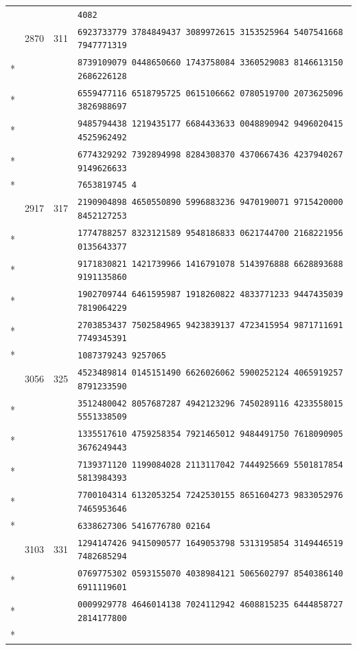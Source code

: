 \documentclass[10pt]{article}
\begin{document}
\begin{longtable}{@{}r@{\quad}r@{\quad}r@{\quad}l@{}}
 & &  & \texttt{4082}\\
\addlinespace[2pt]
69 & 2870 & 311 & \texttt{6923733779 3784849437 3089972615 3153525964 5407541668 7947771319}\\*
 & &  & \texttt{8739109079 0448650660 1743758084 3360529083 8146613150 2686226128}\\*
 & &  & \texttt{6559477116 6518795725 0615106662 0780519700 2073625096 3826988697}\\*
 & &  & \texttt{9485794438 1219435177 6684433633 0048890942 9496020415 4525962492}\\*
 & &  & \texttt{6774329292 7392894998 8284308370 4370667436 4237940267 9149626633}\\*
 & &  & \texttt{7653819745 4}\\
\addlinespace[2pt]
70 & 2917 & 317 & \texttt{2190904898 4650550890 5996883236 9470190071 9715420000 8452127253}\\*
 & &  & \texttt{1774788257 8323121589 9548186833 0621744700 2168221956 0135643377}\\*
 & &  & \texttt{9171830821 1421739966 1416791078 5143976888 6628893688 9191135860}\\*
 & &  & \texttt{1902709744 6461595987 1918260822 4833771233 9447435039 7819064229}\\*
 & &  & \texttt{2703853437 7502584965 9423839137 4723415954 9871711691 7749345391}\\*
 & &  & \texttt{1087379243 9257065}\\
\addlinespace[2pt]
71 & 3056 & 325 & \texttt{4523489814 0145151490 6626026062 5900252124 4065919257 8791233590}\\*
 & &  & \texttt{3512480042 8057687287 4942123296 7450289116 4233558015 5551338509}\\*
 & &  & \texttt{1335517610 4759258354 7921465012 9484491750 7618090905 3676249443}\\*
 & &  & \texttt{7139371120 1199084028 2113117042 7444925669 5501817854 5813984393}\\*
 & &  & \texttt{7700104314 6132053254 7242530155 8651604273 9833052976 7465953646}\\*
 & &  & \texttt{6338627306 5416776780 02164}\\
\addlinespace[2pt]
72 & 3103 & 331 & \texttt{1294147426 9415090577 1649053798 5313195854 3149446519 7482685294}\\*
 & &  & \texttt{0769775302 0593155070 4038984121 5065602797 8540386140 6911119601}\\*
 & &  & \texttt{0009929778 4646014138 7024112942 4608815235 6444858727 2814177800}\\*

\end{longtable}
\end{document}
